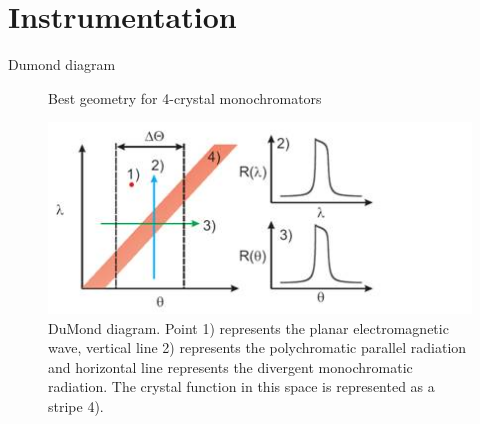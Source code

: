 \documentclass{article}
\begin{document}
\section{Instrumentation}

\begin{description}
        \item [Dumond diagram] Best geometry for 4-crystal monochromators
\end{description}

\begin{figure}
        \centering
        \includegraphics{dumonddiagram.jpg}
        \caption{DuMond diagram. Point 1) represents the planar electromagnetic wave, vertical line 2) represents the polychromatic parallel radiation and horizontal line represents the divergent monochromatic radiation. The crystal function in this space is represented as a stripe 4).}
\end{figure}
\end{document}
